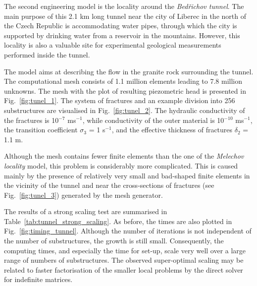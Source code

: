 The second engineering model is the locality around the \emph{Bed\v{r}ichov tunnel}. 
The main purpose of this 2.1 km long tunnel 
near the city of Liberec in the north of the Czech Republic
is accommodating water pipes, through which the city is
supported by drinking water from a reservoir in the mountains.
However, this locality is also a valuable site for experimental geological measurements performed inside the tunnel.

The model aims at describing the flow in the granite rock surrounding the
tunnel. The computational mesh consists of 1.1 million elements leading to 7.8
million unknowns. The mesh with the plot of resulting piezometric head is
presented in Fig.~\ref{fig:tunel_1}. The system of fractures and an example
division into 256 substructures are visualised in Fig.~\ref{fig:tunel_2}. The
hydraulic conductivity of the fractures is 10$^{-7}$ ms$^{-1}$, while
conductivity of the outer material is 10$^{-10}$ ms$^{-1}$, the transition
coefficient $\sigma_{3}$ = 1 s$^{-1}$, and the effective thickness of fractures
$\delta_{2}$ = 1.1 m.

Although the mesh contains fewer finite elements than the one of the
\emph{Melechov locality} model, this problem is considerably more complicated. This is
caused mainly by the presence of relatively very small and bad-shaped finite
elements in the vicinity of the tunnel and near the cross-sections of
fractures (see Fig.~\ref{fig:tunel_3}) generated by the mesh generator.

The results of a strong scaling test are summarised in Table~\ref{tab:tunnel_strong_scaling}. 
As before, the times are also plotted in Fig.~\ref{fig:timing_tunnel}.
Although the number of iterations is not independent of the number of
substructures, the growth is still small. Consequently, the computing times,
and especially the time for set-up, scale very well over a large range of
numbers of substructures. The observed super-optimal scaling may be related to
faster factorisation of the smaller local problems by the direct solver for
indefinite matrices.

